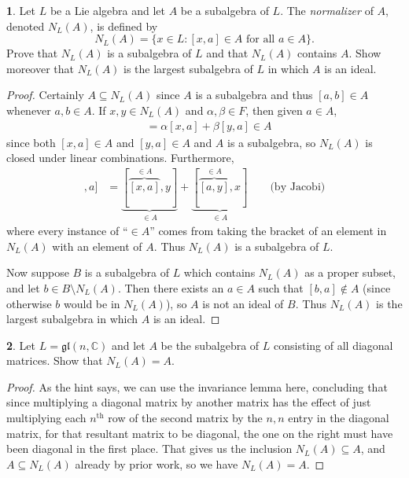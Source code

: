 \documentclass[12pt]{article}
\newcommand{\gl}{\mathfrak{gl}}
\theoremstyle{definition}
\newtheorem{ex}{}
\begin{document}
\begin{ex}
	Let $L$ be a Lie algebra and let $A$ be a subalgebra of $L$.
	The \textit{normalizer} of $A$, denoted $N_L(A)$, is defined by \begin{equation*}
		N_L(A) = \lbrace x \in L : [x,a] \in A \text{ for all } a \in A\rbrace.
	\end{equation*}
	Prove that $N_L(A)$ is a subalgebra of $L$ and that $N_L(A)$ contains $A$.
	Show moreover that $N_L(A)$ is the largest subalgebra of $L$ in which $A$ is an ideal.
\end{ex}
\begin{proof}
	Certainly $A \subseteq N_L(A)$ since $A$ is a subalgebra and thus $[a, b] \in A$ whenever $a, b \in A$.
	If $x, y \in N_L(A)$ and $\alpha, \beta \in F$, then given $a \in A$, \begin{align*}
		[\alpha x + \beta y, a] & = \alpha[x, a] + \beta[y, a] \in A
	\end{align*}
	since both $[x, a] \in A$ and $[y, a] \in A$ and $A$ is a subalgebra, so $N_L(A)$ is closed under linear combinations.
	Furthermore, \begin{align*}
    [[x, y], a] & = \underbrace{[\overbrace{[x, a]}^{\in A}, y]}_{\in A} + \underbrace{[\overbrace{[a, y]}^{\in A}, x]}_{\in A} \hspace{2em}\text{(by Jacobi)}
	\end{align*}
  where every instance of ``$\in A$'' comes from taking the bracket of an element in $N_L(A)$ with an element of $A$.
  Thus $N_L(A)$ is a subalgebra of $L$.

  Now suppose $B$ is a subalgebra of $L$ which contains $N_L(A)$ as a proper subset, and let $b \in B \setminus N_L(A)$.
  Then there exists an $a \in A$ such that $[b, a] \notin A$ (since otherwise $b$ would be in $N_L(A)$), so $A$ is not an ideal of $B$.
  Thus $N_L(A)$ is the largest subalgebra in which $A$ is an ideal.
\end{proof}

\begin{ex}
  Let $L = \gl(n, \mathbb{C})$ and let $A$ be the subalgebra of $L$ consisting of all diagonal matrices.
  Show that $N_L(A) = A$.
\end{ex}
\begin{proof}
  As the hint says, we can use the invariance lemma here, concluding that since multiplying a diagonal matrix by another matrix has the effect of just multiplying each $n^{\text{th}}$ row of the second matrix by the $n,n$ entry in the diagonal matrix, for that resultant matrix to be diagonal, the one on the right must have been diagonal in the first place.
  That gives us the inclusion $N_L(A) \subseteq A$, and $A \subseteq N_L(A)$ already by prior work, so we have $N_L(A) = A$.
\end{proof}
\end{document}
